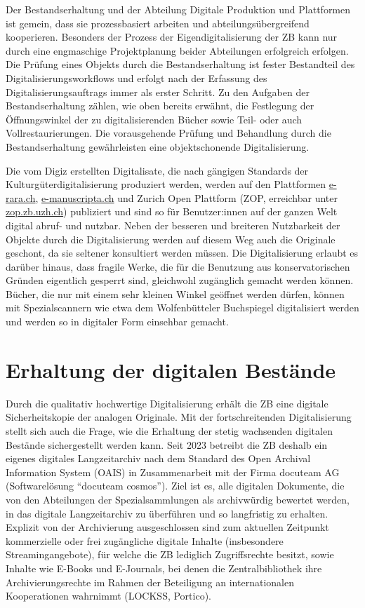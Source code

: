 \documentclass[a4paper,
fontsize=11pt,
oneside,
numbers=noperiodatend,
parskip=half-,
bibliography=totoc,
final
]{scrartcl}
\begin{document}
Der Bestandserhaltung und der Abteilung Digitale Produktion und
Plattformen ist gemein, dass sie prozessbasiert arbeiten und
abteilungsübergreifend kooperieren. Besonders der Prozess der
Eigendigitalisierung der ZB kann nur durch eine engmaschige
Projektplanung beider Abteilungen erfolgreich erfolgen. Die Prüfung
eines Objekts durch die Bestandserhaltung ist fester Bestandteil des
Digitalisierungsworkflows und erfolgt nach der Erfassung des
Digitalisierungsauftrags immer als erster Schritt. Zu den Aufgaben der
Bestandserhaltung zählen, wie oben bereits erwähnt, die Festlegung der
Öffnungswinkel der zu digitalisierenden Bücher sowie Teil- oder auch
Vollrestaurierungen. Die vorausgehende Prüfung und Behandlung durch die
Bestandserhaltung gewährleisten eine objektschonende Digitalisierung.

Die vom Digiz erstellten Digitalisate, die nach gängigen Standards der
Kulturgüterdigitalisierung produziert werden, werden auf den Plattformen
\href{http://www.e-rara.ch/}{e-rara.ch},
\href{http://e-manuscripta.ch}{e-manuscripta.ch} und Zurich Open
Plattform (ZOP, erreichbar unter
\href{http://zop.zb.uzh.ch}{zop.zb.uzh.ch}) publiziert und sind so für
Benutzer:innen auf der ganzen Welt digital abruf- und nutzbar. Neben der
besseren und breiteren Nutzbarkeit der Objekte durch die Digitalisierung
werden auf diesem Weg auch die Originale geschont, da sie seltener
konsultiert werden müssen. Die Digitalisierung erlaubt es darüber
hinaus, dass fragile Werke, die für die Benutzung aus konservatorischen
Gründen eigentlich gesperrt sind, gleichwohl zugänglich gemacht werden
können. Bücher, die nur mit einem sehr kleinen Winkel geöffnet werden
dürfen, können mit Spezialscannern wie etwa dem Wolfenbütteler
Buchspiegel digitalisiert werden und werden so in digitaler Form
einsehbar gemacht.

\hypertarget{erhaltung-der-digitalen-bestuxe4nde}{%
\section{Erhaltung der digitalen
Bestände}\label{erhaltung-der-digitalen-bestuxe4nde}}

Durch die qualitativ hochwertige Digitalisierung erhält die ZB eine
digitale Sicherheitskopie der analogen Originale. Mit der
fortschreitenden Digitalisierung stellt sich auch die Frage, wie die
Erhaltung der stetig wachsenden digitalen Bestände sichergestellt werden
kann. Seit 2023 betreibt die ZB deshalb ein eigenes digitales
Langzeitarchiv nach dem Standard des Open Archival Information System
(OAIS) in Zusammenarbeit mit der Firma docuteam AG (Softwarelösung
\enquote{docuteam cosmos}). Ziel ist es, alle digitalen Dokumente, die
von den Abteilungen der Spezialsammlungen als archivwürdig bewertet
werden, in das digitale Langzeitarchiv zu überführen und so langfristig
zu erhalten. Explizit von der Archivierung ausgeschlossen sind zum
aktuellen Zeitpunkt kommerzielle oder frei zugängliche digitale Inhalte
(insbesondere Streamingangebote), für welche die ZB lediglich
Zugriffsrechte besitzt, sowie Inhalte wie E-Books und E-Journals, bei
denen die Zentralbibliothek ihre Archivierungsrechte im Rahmen der
Beteiligung an internationalen Kooperationen wahrnimmt (LOCKSS,
Portico).
\end{document}
